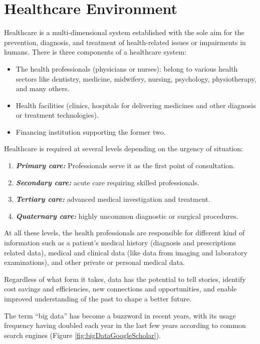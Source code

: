 \section{Healthcare Environment}
Healthcare is a multi-dimensional system established with the sole aim for the prevention, diagnosis, and treatment of health-related issues or impairments in humans. There is three components of a healthcare system\cite{dash2019big}:
\begin{itemize}
  \renewcommand{\labelitemi}{$\bullet$}
    \item The health professionals (physicians or nurses): belong to various health sectors like dentistry, medicine, midwifery, nursing, psychology, physiotherapy, and many others.
    \item Health facilities (clinics, hospitals for delivering medicines and other diagnosis or treatment technologies).
    \item Financing institution supporting the former two.
  \end{itemize}
  Healthcare is required at several levels depending on the urgency of situation:
  \begin{enumerate}
    \item \textbf{\textit{Primary care:}} Professionals serve it as the first point of consultation.
    \item \textbf{\textit{Secondary care:}} acute care requiring skilled professionals.
    \item \textbf{\textit{Tertiary care:}} advanced medical investigation and treatment.
    \item \textbf{\textit{Quaternary care:}} highly uncommon diagnostic or surgical procedures.
  \end{enumerate}
 At all these levels, the health professionals are responsible for different kind of information such as a patient's medical history (diagnosis and prescriptions related data), medical and clinical data (like data from imaging and laboratory examinations), and other private or personal medical data.


Regardless of what form it takes, data has the potential to tell stories, identify cost savings and efficiencies, new connections and opportunities, and enable improved understanding of the past to shape a better future\cite{Zillner2016}.

The term “big data” has become a buzzword in recent years, with its usage frequency having doubled each year in the last few years according to common search engines (Figure \ref{fig:bigDataGoogleScholar}).

